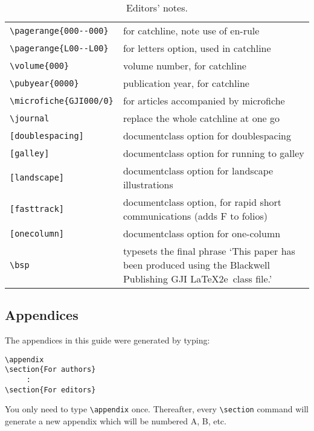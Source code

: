 \begin{table*}
\begin{minipage}{130mm}
\caption{Editors' notes.}\label{editors}
\begin{tabular}{@{}lp{270pt}}
\verb"\pagerange{000--000}"& for catchline, note use of en-rule\\
\verb"\pagerange{L00--L00}"& for letters option, used in catchline\\
\verb"\volume{000}" & volume number, for catchline\\
\verb"\pubyear{0000}" & publication year, for catchline\\
\verb"\microfiche{GJI000/0}" & for articles accompanied by microfiche\\
\verb"\journal" & replace the whole catchline at one go\\
\verb"[doublespacing]" & documentclass option for doublespacing\\
\verb"[galley]" & documentclass option for running to galley\\
\verb"[landscape]" & documentclass option for landscape illustrations\\
\verb"[fasttrack]" & documentclass option, for rapid short communications
                   (adds F to folios)\\
\verb"[onecolumn]" & documentclass option for one-column \\
\verb"\bsp"& typesets the final phrase `This paper has been produced
 using the Blackwell Publishing GJI \LaTeX2e\ class file.'\\
\end{tabular}
\end{minipage}
\end{table*}

\subsection{Appendices}

The appendices in this guide were generated by typing:
\begin{verbatim}
\appendix
\section{For authors}
     :
\section{For editors}
\end{verbatim}
You only need to type \verb"\appendix" once. Thereafter, every \verb"\section"
command will generate a new appendix which will be numbered A, B, etc.

